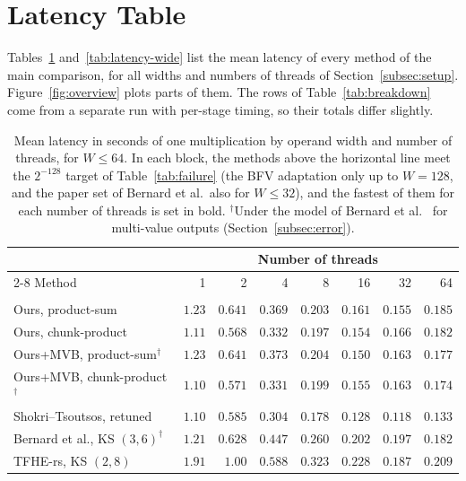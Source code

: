 \section{Latency Table}\label{app:latency}
Tables~\ref{tab:latency} and~\ref{tab:latency-wide} list the mean latency of every method of the main comparison, for all widths and numbers of threads of Section~\ref{subsec:setup}. Figure~\ref{fig:overview} plots parts of them. The rows of Table~\ref{tab:breakdown} come from a separate run with per-stage timing, so their totals differ slightly.
\begin{table}[p]
\centering
\small
\renewcommand{\arraystretch}{1.0}
\caption{Mean latency in seconds of one multiplication by operand width and number of threads, for $W\le64$. In each block, the methods above the horizontal line meet the $2^{-128}$ target of Table~\ref{tab:failure} (the BFV adaptation only up to $W=128$, and the paper set of Bernard et al.\ also for $W\le32$), and the fastest of them for each number of threads is set in bold. $^\dagger$Under the model of Bernard et al.~\cite{bernard2026lownoise} for multi-value outputs (Section~\ref{subsec:error}).}
\label{tab:latency}
\setlength{\tabcolsep}{7pt}
\begin{tabular}{@{}lrrrrrrr@{}}
\toprule
& \multicolumn{7}{c}{Number of threads} \\
\cmidrule(l){2-8}
Method & 1 & 2 & 4 & 8 & 16 & 32 & 64 \\
\midrule[0.8pt]
\rowcolor{black!8}\multicolumn{8}{@{}l}{\textbf{$W=16$}} \\
\midrule
Ours, product-sum & $1.23$ & $0.641$ & $0.369$ & $0.203$ & $0.161$ & $0.155$ & $0.185$ \\
Ours, chunk-product & $1.11$ & $\mathbf{0.568}$ & $0.332$ & $0.197$ & $0.154$ & $0.166$ & $0.182$ \\
Ours+MVB, product-sum$^\dagger$ & $1.23$ & $0.641$ & $0.373$ & $0.204$ & $0.150$ & $0.163$ & $0.177$ \\
Ours+MVB, chunk-product$^\dagger$ & $1.10$ & $0.571$ & $0.331$ & $0.199$ & $0.155$ & $0.163$ & $0.174$ \\
Shokri--Tsoutsos, retuned & $\mathbf{1.10}$ & $0.585$ & $\mathbf{0.304}$ & $\mathbf{0.178}$ & $\mathbf{0.128}$ & $\mathbf{0.118}$ & $\mathbf{0.133}$ \\
Bernard et al., KS $(3,6)^\dagger$ & $1.21$ & $0.628$ & $0.447$ & $0.260$ & $0.202$ & $0.197$ & $0.182$ \\
TFHE-rs, KS $(2,8)$ & $1.91$ & $1.00$ & $0.588$ & $0.323$ & $0.228$ & $0.187$ & $0.209$ \\

\end{tabular}
\end{table}
